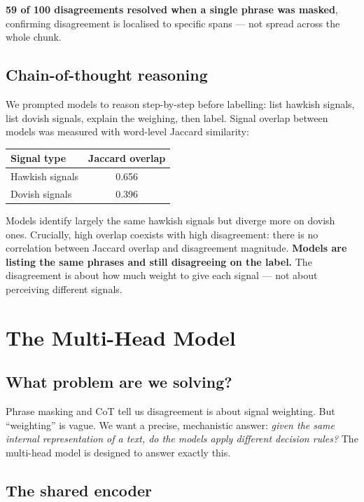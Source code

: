 \documentclass[11pt,a4paper]{article}
\begin{document}
\textbf{59 of 100 disagreements resolved when a single phrase was masked},
confirming disagreement is localised to specific spans --- not spread across
the whole chunk.

\subsection{Chain-of-thought reasoning}

We prompted models to reason step-by-step before labelling: list hawkish
signals, list dovish signals, explain the weighing, then label. Signal overlap
between models was measured with word-level Jaccard similarity:

\begin{center}
\begin{tabular}{lc}
\toprule
\textbf{Signal type} & \textbf{Jaccard overlap} \\
\midrule
Hawkish signals & 0.656 \\
Dovish signals  & 0.396 \\
\bottomrule
\end{tabular}
\end{center}

Models identify largely the same hawkish signals but diverge more on dovish
ones. Crucially, high overlap coexists with high disagreement: there is no
correlation between Jaccard overlap and disagreement magnitude. \textbf{Models
are listing the same phrases and still disagreeing on the label.} The
disagreement is about how much weight to give each signal --- not about
perceiving different signals.

\section{The Multi-Head Model}

\subsection{What problem are we solving?}

Phrase masking and CoT tell us disagreement is about signal weighting. But
``weighting'' is vague. We want a precise, mechanistic answer: \emph{given
the same internal representation of a text, do the models apply different
decision rules?} The multi-head model is designed to answer exactly this.

\subsection{The shared encoder}
\end{document}
